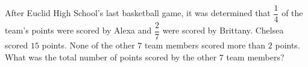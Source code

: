 After Euclid High School's last basketball game, it was determined that $\dfrac{1}{4}$ of the team's points were scored by Alexa and $\dfrac{2}{7}$ were scored by Brittany. Chelsea scored $15$ points. None of the other $7$ team members scored more than $2$ points. What was the total number of points scored by the other $7$ team members?
